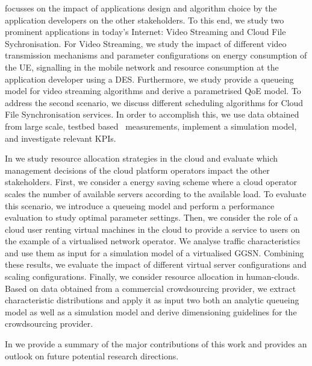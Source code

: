  focusses on the impact of applications design and algorithm choice by the application developers on the other stakeholders.
To this end, we study two prominent applications in today's Internet: Video Streaming and Cloud File Sychronisation.
For Video Streaming, we study the impact of different video transmission mechanisms and parameter configurations on energy consumption of the \gls{UE}, signalling in the mobile network and resource consumption at the application developer using a \gls{DES}.
Furthermore, we study provide a queueing model for video streaming algorithms and derive a parametrised \gls{QoE} model.
To address the second scenario, we discuss different scheduling algorithms for Cloud File Synchronisation services.
In order to accomplish this, we use data obtained from large scale, testbed based~\cite{Chun2003} measurements, implement a simulation model, and investigate relevant \glspl{KPI}.  

In  we study resource allocation strategies in the cloud and evaluate which management decisions of the cloud platform operators impact the other stakeholders.
First, we consider a energy saving scheme where a cloud operator scales the number of available servers according to the available load.
To evaluate this scenario, we introduce a queueing model and perform a performance evaluation to study optimal parameter settings.
Then, we consider the role of a cloud user renting virtual machines in the cloud to provide a service to users on the example of a virtualised network operator.
We analyse traffic characteristics and use them as input for a simulation model of a virtualised \gls{GGSN}.
Combining these results, we evaluate the impact of different virtual server configurations and scaling configurations.
Finally, we consider resource allocation in human-clouds.
Based on data obtained from a commercial crowdsourcing provider, we extract characteristic distributions and apply it as input two both an analytic queueing model as well as a simulation model and derive dimensioning guidelines for the crowdsourcing provider.

In  we provide a summary of the major contributions of this work and provides an outlook on future potential research directions.